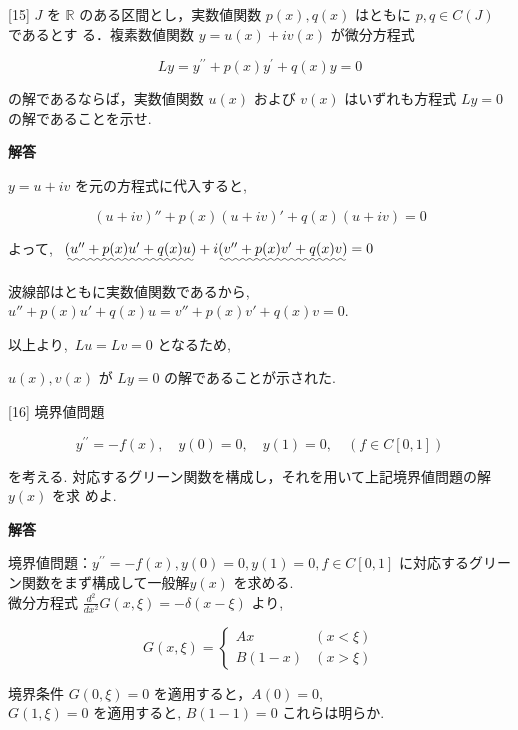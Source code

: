 \documentclass{jsarticle}
\begin{document}
\bigskip
\bigskip

\begin{itembox}[l]{[15]}
$J$ を $\mathbb{R}$ のある区間とし，実数値関数 $p(x), q(x)$ はともに $p, q \in C(J)$ であるとす る．複素数値関数 $y=u(x)+i v(x)$ が微分方程式


\begin{equation*}
L y=y^{\prime \prime}+p(x) y^{\prime}+q(x) y=0 \tag{26}
\end{equation*}


の解であるならば，実数値関数 $u(x)$ および $v(x)$ はいずれも方程式 $L y=0$ の解であることを示せ.  
\end{itembox}

\textbf{解答}

$y = u + iv$ を元の方程式に代入すると,

$$
(u +iv)'' + p(x)(u+iv)' + q(x)(u+iv) = 0
$$

よって, \ $\uwave{(u'' + p(x)u' + q(x)u)} + i\uwave{(v'' + p(x)v' + q(x)v)} = 0$

波線部はともに実数値関数であるから, \ $u'' + p(x)u' + q(x)u = v'' + p(x)v' + q(x)v = 0$.

以上より,\ $Lu = Lv = 0$ となるため,

$u(x), v(x)$ が $Ly=0$ の解であることが示された.


\bigskip
\bigskip

\begin{itembox}[l]{[16]}
境界値問題


\begin{equation*}
y^{\prime \prime}=-f(x), \quad y(0)=0, \quad y(1)=0, \quad(f \in C[0,1]) \tag{27}
\end{equation*}


を考える. 対応するグリーン関数を構成し，それを用いて上記境界値問題の解 $y(x)$ を求 めよ.  
\end{itembox}

\textbf{解答}

境界値問題：$y^{\prime \prime} = -f(x), y(0)=0, y(1)=0, f \in C[0,1]$ に対応するグリーン関数をまず構成して一般解$y(x)$ を求める.\\
微分方程式 $\frac{d^2}{d x^2} G(x, \xi)=-\delta(x-\xi)$ より,

$$
G(x, \xi)= \begin{cases}A x & (x<\xi) \\ B(1-x) & (x>\xi)\end{cases}
$$

境界条件 $G(0, \xi)=0$ を適用すると，$A(0)=0$,
$G(1, \xi)=0 \text { を適用すると, } B(1-1)=0$
これらは明らか.
\end{document}
